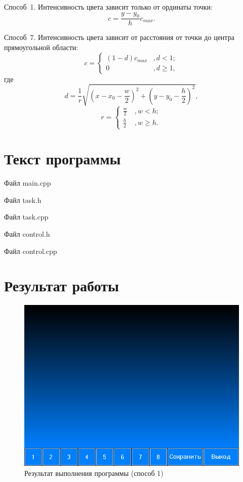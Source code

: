 \documentclass[14pt, a4paper]{extreport}
\begin{document}
Способ~1. Интенсивность цвета зависит только от ординаты точки:
$$ c = \frac{y - y_0}{h} c_{max} . $$

Способ~7. Интенсивность цвета зависит от расстояния от точки до центра прямоугольной области:
$$ c = \left\{ \begin{aligned} (1 - d) c_{max} &, d < 1; \\ 0 &, d \geq 1, \end{aligned} \right. $$
где
$$ d = \frac{1}{r} \sqrt{\left( x - x_0 - \frac{w}{2} \right) ^ 2 + \left( y - y_0 - \frac{h}{2} \right) ^ 2}, $$
$$ r = \left\{ \begin{aligned} \frac{w}{2} \ &, w < h; \\ \frac{h}{2} \ &, w \geq h. \end{aligned} \right. $$

\chapter{Текст программы}

\noindent Файл main.cpp

\pagebreak
\hrulefill

\noindent Файл task.h

\hrulefill

\noindent Файл task.cpp

\hrulefill

\noindent Файл control.h

\hrulefill

\noindent Файл control.cpp


\chapter{Результат работы}

\begin{figure}[h!]
	\centering
	\includegraphics[width = 12cm]{image/image_1}
  \caption{Результат выполнения программы (способ 1)}
\end{figure}
\end{document}
